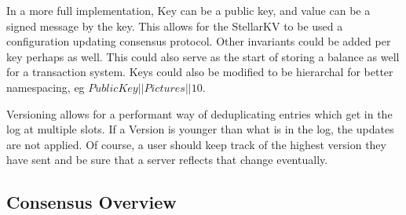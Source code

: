 \documentclass[preprint,11pt]{article} \usepackage{amsmath}
\begin{document}
In a more full implementation, Key can be a public key, and value can
be a signed message by the key. This allows for the StellarKV to be
used a configuration updating consensus protocol. Other invariants
could be added per key perhaps as well. This could also serve as the
start of storing a balance as well for a transaction system. Keys
could also be modified to be hierarchal for better namespacing, eg
$Public Key||Pictures||10$.

Versioning allows for a performant way of deduplicating entries which
get in the log at multiple slots. If a Version is younger than what is
in the log, the updates are not applied. Of course, a user should keep
track of the highest version they have sent and be sure that a server
reflects that change eventually.

\subsection{Consensus Overview}

\begingroup
\raggedright

\endgroup
\end{document}
